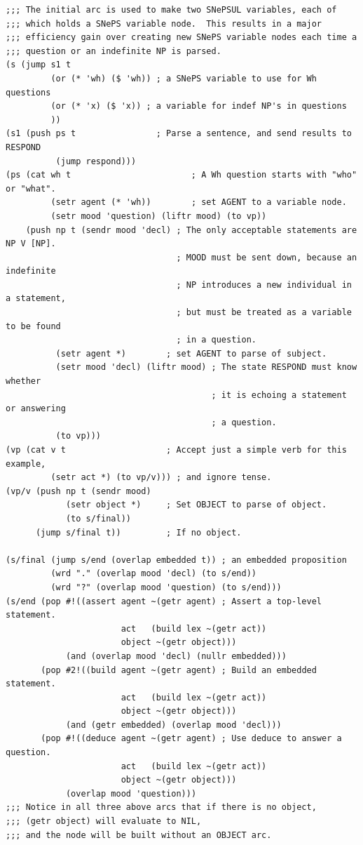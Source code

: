 \documentclass{book}
\begin{document}
\begin{verbatim}
;;; The initial arc is used to make two SNePSUL variables, each of
;;; which holds a SNePS variable node.  This results in a major
;;; efficiency gain over creating new SNePS variable nodes each time a
;;; question or an indefinite NP is parsed.
(s (jump s1 t 
         (or (* 'wh) ($ 'wh)) ; a SNePS variable to use for Wh questions
         (or (* 'x) ($ 'x)) ; a variable for indef NP's in questions
         ))
(s1 (push ps t                ; Parse a sentence, and send results to RESPOND
          (jump respond)))
(ps (cat wh t                        ; A Wh question starts with "who" or "what".
         (setr agent (* 'wh))        ; set AGENT to a variable node.
         (setr mood 'question) (liftr mood) (to vp))
    (push np t (sendr mood 'decl) ; The only acceptable statements are NP V [NP].
                                  ; MOOD must be sent down, because an indefinite
                                  ; NP introduces a new individual in a statement,
                                  ; but must be treated as a variable to be found
                                  ; in a question. 
          (setr agent *)        ; set AGENT to parse of subject.
          (setr mood 'decl) (liftr mood) ; The state RESPOND must know whether
                                         ; it is echoing a statement or answering
                                         ; a question.
          (to vp)))
(vp (cat v t                    ; Accept just a simple verb for this example,
         (setr act *) (to vp/v))) ; and ignore tense.
(vp/v (push np t (sendr mood)
            (setr object *)     ; Set OBJECT to parse of object.
            (to s/final))
      (jump s/final t))         ; If no object.

(s/final (jump s/end (overlap embedded t)) ; an embedded proposition
         (wrd "." (overlap mood 'decl) (to s/end))
         (wrd "?" (overlap mood 'question) (to s/end)))
(s/end (pop #!((assert agent ~(getr agent) ; Assert a top-level statement.
                       act   (build lex ~(getr act))
                       object ~(getr object)))
            (and (overlap mood 'decl) (nullr embedded)))
       (pop #2!((build agent ~(getr agent) ; Build an embedded statement.
                       act   (build lex ~(getr act))
                       object ~(getr object)))
            (and (getr embedded) (overlap mood 'decl)))
       (pop #!((deduce agent ~(getr agent) ; Use deduce to answer a question.
                       act   (build lex ~(getr act))
                       object ~(getr object)))
            (overlap mood 'question)))
;;; Notice in all three above arcs that if there is no object,
;;; (getr object) will evaluate to NIL,
;;; and the node will be built without an OBJECT arc.
\end{verbatim}
\end{document}

